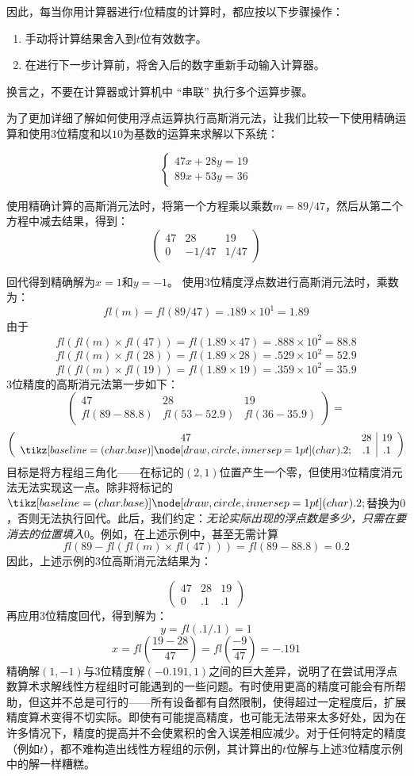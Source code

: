 因此，每当你用计算器进行$t$位精度的计算时，都应按以下步骤操作：

\begin{enumerate}
    \item 手动将计算结果舍入到$t$位有效数字。
    \item 在进行下一步计算前，将舍入后的数字重新手动输入计算器。
\end{enumerate}
换言之，不要在计算器或计算机中 “串联” 执行多个运算步骤。

为了更加详细了解如何使用浮点运算执行高斯消元法，让我们比较一下使用精确运算和使用$3$位精度和以$10$为基数的运算来求解以下系统：

$$\begin{cases}
    47x + 28y = 19 \\
    89x + 53y = 36
\end{cases}$$

使用精确计算的高斯消元法时，将第一个方程乘以乘数$m = 89/47$，然后从第二个方程中减去结果，得到：
$$\left(\begin{array}{cc|c}
    47 & 28 & 19 \\
    0 & -1/47 & 1/47
\end{array}\right) $$

回代得到精确解为$x=1$和$y=-1$。
使用$3$位精度浮点数进行高斯消元法时，乘数为：
$$fl(m) = fl(89/47) = .189 \times 10^1 = 1.89$$
由于
$$fl(fl(m) \times fl(47)) = fl(1.89 \times 47) = .888 \times 10^2 = 88.8$$
$$fl(fl(m) \times fl(28)) = fl(1.89 \times 28) = .529 \times 10^2 = 52.9$$
$$fl(fl(m) \times fl(19)) = fl(1.89 \times 19) = .359 \times 10^2 = 35.9$$
$3$位精度的高斯消元法第一步如下：
$$
\left(\begin{array}{cc|c}
    47 & 28 & 19 \\
    fl(89-88.8) & fl(53-52.9) & fl(36-35.9)
\end{array}\right) =
$$
$$
\left(\begin{array}{cc|c}
    47 & 28 & 19 \\
    \circlednum{.2} & .1 & .1
\end{array}\right)
$$
目标是将方程组三角化——在标记的$(2,1)$位置产生一个零，但使用3位精度消元法无法实现这一点。除非将标记的$\circlednum{.2}$替换为$0$，否则无法执行回代。此后，我们约定：\textit{无论实际出现的浮点数是多少，只需在要消去的位置填入$0$}。例如，在上述示例中，甚至无需计算
$$fl(89 - fl(fl(m) \times fl(47))) = fl(89 - 88.8) = 0.2$$
因此，上述示例的3位高斯消元法结果为：

$$
\left(\begin{array}{cc|c} 
47 & 28 & 19 \\
0 & .1 & .1
\end{array}\right)
$$
再应用3位精度回代，得到解为：
$$y = fl(.1/.1) = 1$$
$$x = fl(\frac{19-28}{47})=fl(\frac{-9}{47})=-.191$$
精确解$(1, -1)$与3位精度解$(-0.191, 1)$之间的巨大差异，说明了在尝试用浮点数算术求解线性方程组时可能遇到的一些问题。有时使用更高的精度可能会有所帮助，但这并不总是可行的——所有设备都有自然限制，使得超过一定程度后，扩展精度算术变得不切实际。即使有可能提高精度，也可能无法带来太多好处，因为在许多情况下，精度的提高并不会使累积的舍入误差相应减少。对于任何特定的精度（例如$t$），都不难构造出线性方程组的示例，其计算出的$t$位解与上述3位精度示例中的解一样糟糕。

